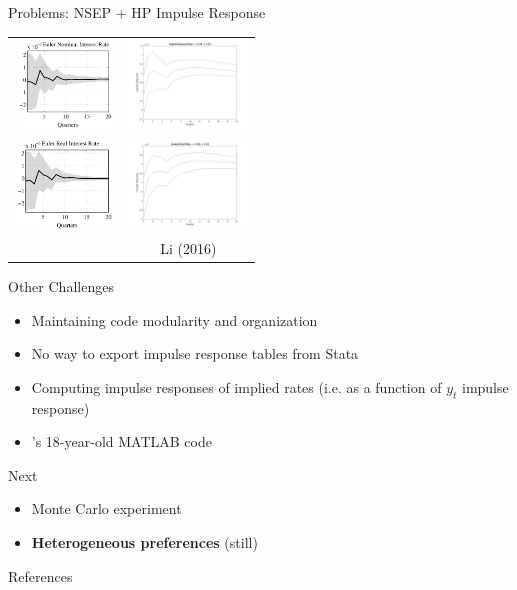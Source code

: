 \documentclass{beamer}
\begin{document}
\begin{frame}{Problems: NSEP + HP Impulse Response}
\begin{center}
\begin{tabular}{cc}
\includegraphics[height=90px]{figs/irf/nominal_implied_4_collard.png} &
\includegraphics[height=90px]{figs/irf/nominal_implied_4.png} \\
\includegraphics[height=90px]{figs/irf/real_implied_4_collard.png} &
\includegraphics[height=90px]{figs/irf/real_implied_4.png} \\
\cite{collard11} & Li (2016)
\end{tabular}
\end{center}
\end{frame}

\begin{frame}{Other Challenges}
\begin{itemize}
\item Maintaining code modularity and organization
\item No way to export impulse response tables from Stata
\item Computing impulse responses of implied rates (i.e. as a function of $y_t$ impulse response)
\item \cite{kilian98}'s 18-year-old MATLAB code
\end{itemize}
\end{frame}

\begin{frame}{Next}
\begin{itemize}
\item Monte Carlo experiment
\item \textbf{Heterogeneous preferences} (still)
\end{itemize}
\end{frame}

\begin{frame}{References}


\end{frame}
\end{document}
